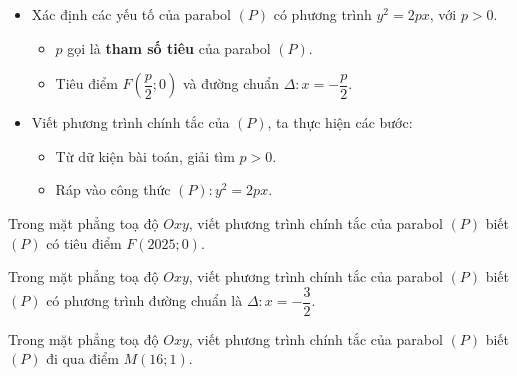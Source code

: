 \begin{dang}
	\begin{itemize}
	\item Xác định các yếu tố của parabol $(P)$ có phương trình $y^2=2px$, với $p>0$.
	\begin{itemize}
		\item $p$ gọi là \textbf{tham số tiêu} của parabol $(P)$.
		\item Tiêu điểm $F\left(\dfrac{p}{2} ; 0\right)$ và đường chuẩn $\Delta: x=-\dfrac{p}{2}$.
	\end{itemize}
	\item Viết phương trình chính tắc của $(P)$, ta thực hiện các bước:
	\begin{itemize}
		\item Từ dữ kiện bài toán, giải tìm $p>0$. 
		\item Ráp vào công thức $(P)\colon y^2=2px$.
	\end{itemize}
\end{itemize}
\end{dang}
\begin{vd}%
	Trong mặt phẳng toạ độ $Oxy$, viết phương trình chính tắc của parabol $(P)$ biết $(P)$ có tiêu điểm $F(2025;0)$.
\end{vd}
\begin{vd}%
	Trong mặt phẳng toạ độ $Oxy$, viết phương trình chính tắc của parabol $(P)$ biết $(P)$ có phương trình đường chuẩn là $\Delta\colon x=-\dfrac{3}{2}$.
\end{vd}
\begin{vd}%
	Trong mặt phẳng toạ độ $Oxy$, viết phương trình chính tắc của parabol $(P)$ biết $(P)$ đi qua điểm $M(16;1)$.
\end{vd}
